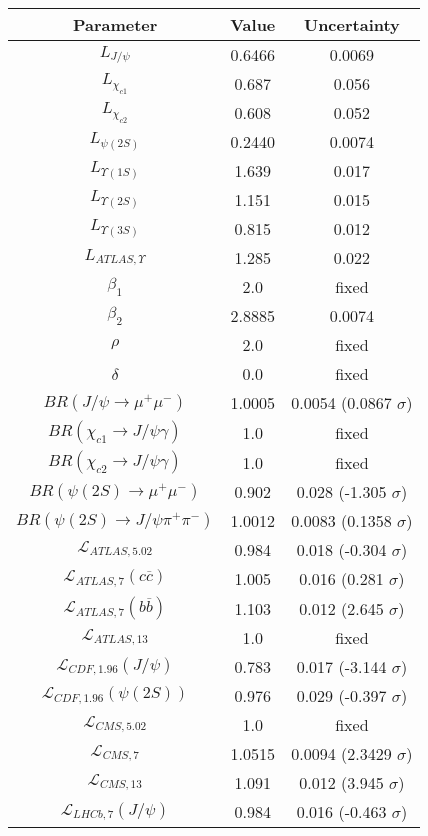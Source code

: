 \begin{table}[h!]
\centering
\begin{tabular}{c|c|c}
Parameter & Value & Uncertainty \\
\hline
$L_{J/\psi}$ & 0.6466 & 0.0069 \\
$L_{\chi_{c1}}$ & 0.687 & 0.056 \\
$L_{\chi_{c2}}$ & 0.608 & 0.052 \\
$L_{\psi(2S)}$ & 0.2440 & 0.0074 \\
$L_{\Upsilon(1S)}$ & 1.639 & 0.017 \\
$L_{\Upsilon(2S)}$ & 1.151 & 0.015 \\
$L_{\Upsilon(3S)}$ & 0.815 & 0.012 \\
$L_{ATLAS,\Upsilon}$ & 1.285 & 0.022 \\
$\beta_1$ & 2.0 & fixed \\
$\beta_2$ & 2.8885 & 0.0074 \\
$\rho$ & 2.0 & fixed \\
$\delta$ & 0.0 & fixed \\
$BR(J/\psi\rightarrow\mu^+\mu^-)$ & 1.0005 & 0.0054 (0.0867 $\sigma$) \\
$BR(\chi_{c1}\rightarrow J/\psi\gamma)$ & 1.0 & fixed \\
$BR(\chi_{c2}\rightarrow J/\psi\gamma)$ & 1.0 & fixed \\
$BR(\psi(2S)\rightarrow\mu^+\mu^-)$ & 0.902 & 0.028 (-1.305 $\sigma$) \\
$BR(\psi(2S)\rightarrow J/\psi\pi^+\pi^-)$ & 1.0012 & 0.0083 (0.1358 $\sigma$) \\
$\mathcal L_{ATLAS,5.02}$ & 0.984 & 0.018 (-0.304 $\sigma$) \\
$\mathcal L_{ATLAS,7}(c\overline c)$ & 1.005 & 0.016 (0.281 $\sigma$) \\
$\mathcal L_{ATLAS,7}(b\overline b)$ & 1.103 & 0.012 (2.645 $\sigma$) \\
$\mathcal L_{ATLAS,13}$ & 1.0 & fixed \\
$\mathcal L_{CDF,1.96}(J/\psi)$ & 0.783 & 0.017 (-3.144 $\sigma$) \\
$\mathcal L_{CDF,1.96}(\psi(2S))$ & 0.976 & 0.029 (-0.397 $\sigma$) \\
$\mathcal L_{CMS,5.02}$ & 1.0 & fixed \\
$\mathcal L_{CMS,7}$ & 1.0515 & 0.0094 (2.3429 $\sigma$) \\
$\mathcal L_{CMS,13}$ & 1.091 & 0.012 (3.945 $\sigma$) \\
$\mathcal L_{LHCb,7}(J/\psi)$ & 0.984 & 0.016 (-0.463 $\sigma$) \\

\end{tabular}
\end{table}
